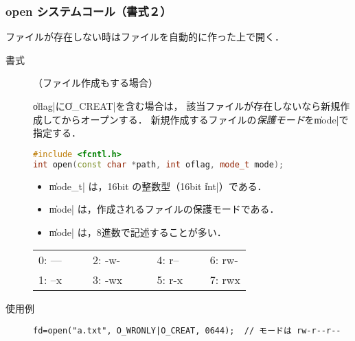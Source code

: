 \documentclass{beamer}                 %
\begin{document}
\begin{frame}[fragile]
  \frametitle{open システムコール（書式２）}
  ファイルが存在しない時はファイルを自動的に作った上で開く．

\begin{description}
\item[書式]（ファイル作成もする場合）

\|oflag|に\|O_CREAT|を含む場合は，
該当ファイルが存在しないなら新規作成してからオープンする．
新規作成するファイルの\emph{保護モード}を\|mode|で指定する．

\begin{lstlisting}[language=C++]
#include <fcntl.h>
int open(const char *path, int oflag, mode_t mode);
\end{lstlisting}

\begin{itemize}
\item \|mode_t| は，16bit の整数型（16bit \|int|）である．
\item \|mode| は，作成されるファイルの保護モードである．
\item \|mode| は，8進数で記述することが多い．
\end{itemize}

{\footnotesize\ttfamily\begin{center}\begin{tabular}{l l l l}
0: --- ~~~ & 2: -w-  ~~~~ & 4: r-- ~~~ & 6: rw- \\
1: --x     & 3: -wx       & 5: r-x     & 7: rwx \\
\end{tabular}\end{center}}

\item[使用例]
\begin{lstlisting}[numbers=none]
fd=open("a.txt", O_WRONLY|O_CREAT, 0644);  // モードは rw-r--r--
\end{lstlisting}

\end{description}
\end{frame}
\end{document}

